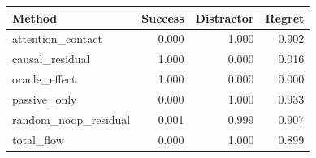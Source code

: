 \begin{tabular}{lrrr}
\toprule
Method & Success & Distractor & Regret\\
\midrule
attention\_contact & 0.000 & 1.000 & 0.902\\
causal\_residual & 1.000 & 0.000 & 0.016\\
oracle\_effect & 1.000 & 0.000 & 0.000\\
passive\_only & 0.000 & 1.000 & 0.933\\
random\_noop\_residual & 0.001 & 0.999 & 0.907\\
total\_flow & 0.000 & 1.000 & 0.899\\
\bottomrule
\end{tabular}
